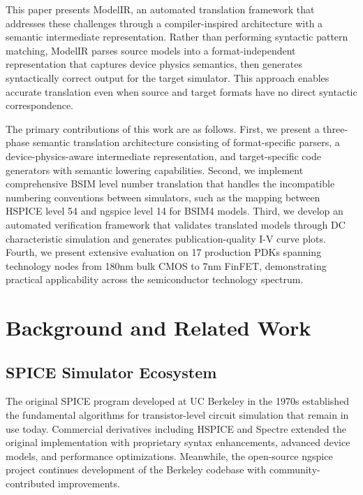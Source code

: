 \documentclass[conference]{IEEEtran}
\begin{document}
This paper presents ModelIR, an automated translation framework that addresses these challenges through a compiler-inspired architecture with a semantic intermediate representation. Rather than performing syntactic pattern matching, ModelIR parses source models into a format-independent representation that captures device physics semantics, then generates syntactically correct output for the target simulator. This approach enables accurate translation even when source and target formats have no direct syntactic correspondence.

The primary contributions of this work are as follows. First, we present a three-phase semantic translation architecture consisting of format-specific parsers, a device-physics-aware intermediate representation, and target-specific code generators with semantic lowering capabilities. Second, we implement comprehensive BSIM level number translation that handles the incompatible numbering conventions between simulators, such as the mapping between HSPICE level 54 and ngspice level 14 for BSIM4 models. Third, we develop an automated verification framework that validates translated models through DC characteristic simulation and generates publication-quality I-V curve plots. Fourth, we present extensive evaluation on 17 production PDKs spanning technology nodes from 180nm bulk CMOS to 7nm FinFET, demonstrating practical applicability across the semiconductor technology spectrum.

\section{Background and Related Work}
\label{sec:background}

\subsection{SPICE Simulator Ecosystem}

The original SPICE program developed at UC Berkeley in the 1970s established the fundamental algorithms for transistor-level circuit simulation that remain in use today. Commercial derivatives including HSPICE and Spectre extended the original implementation with proprietary syntax enhancements, advanced device models, and performance optimizations. Meanwhile, the open-source ngspice project continues development of the Berkeley codebase with community-contributed improvements.
\end{document}
